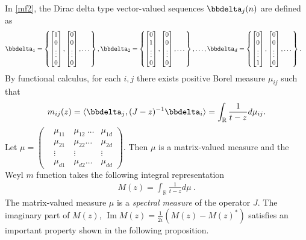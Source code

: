 \documentclass[reqno]{amsart}
\numberwithin{equation}{section}
\newcommand{\R}{\mathbb{R}}
\newcommand{\ip}[2]
      {\ensuremath{\langle #1,#2 \rangle}}
\begin{document}
In \eqref{mf2}, the Dirac delta type vector-valued sequences   $\bbdelta_j(n)$ are defined as 
\begin{align*} 
	&\bbdelta_1 = \left \{\begin{bmatrix}1\\0\\  \vdots \\ 0 \end{bmatrix}, \begin{bmatrix}0\\0\\  \vdots \\ 0 \end{bmatrix}, \dots  \right\}, \bbdelta_2 = \left \{\begin{bmatrix}0\\1\\  \vdots \\ 0 \end{bmatrix}, \begin{bmatrix}0\\0\\  \vdots \\ 0 \end{bmatrix},  \dots  \right\},\ldots,
\bbdelta_d = \left \{ \begin{bmatrix}0\\0\\  \vdots \\ 1 \end{bmatrix},  \begin{bmatrix}0\\0\\  \vdots \\ 0 \end{bmatrix},  \dots \right\}
.\end{align*}
 By functional calculus, for each $ i, j$ there exists positive Borel measure  $\mu_{ij}$ such that
 \begin{align} \label{ir}
 m_{ij}(z) =\ip{\bbdelta_j}{(J-z)^{-1}\bbdelta_i} = \int_{\R} \frac{1}{t-z} d\mu_{ij}.
 \end{align}
 Let $ \mu =  \begin{pmatrix}  & \mu_{11} \    &\mu_{12} \ \dots &\mu_{1d} \\   &\mu_{21} \ & \mu_{22} \dots &\mu_{2d}     \\   & \vdots & \vdots  &\vdots \\  &\mu_{d1} &\mu_{d2} \dots & \mu_{dd}\end{pmatrix}. $ Then $\mu$ is a matrix-valued measure and the Weyl $m$ function takes the following integral representation 
  \begin{align}
  \label{irm} M(z) =  \int_{\R} \frac{1}{t-z} d\mu   \ .
  \end{align} 
 The matrix-valued measure $\mu$ is a \textit{spectral measure} of the  operator $J.$  The imaginary part of $M(z)$,     $ \operatorname {Im}M(z) = \frac{1}{2i}(M(z)- M(z)^*)  $ satisfies an important property shown in the following proposition.
	
\end{document}
